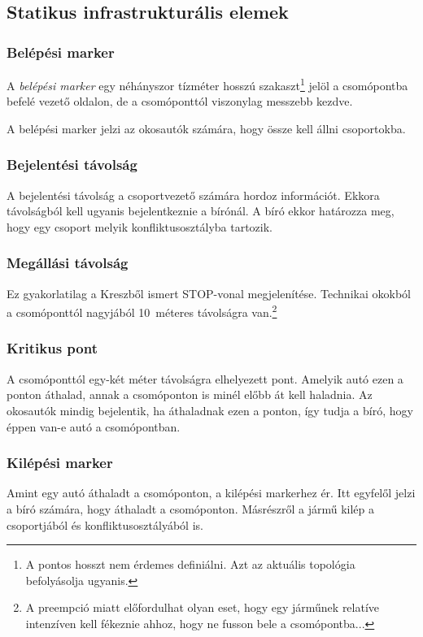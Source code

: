 \documentclass{report}
\begin{document}
			\subsection{Statikus infrastrukturális elemek}
				\subsubsection{Belépési marker}
					A \emph{belépési marker} egy néhányszor tízméter hosszú szakaszt\footnote{A pontos hosszt nem érdemes definiálni. Azt az aktuális topológia befolyásolja ugyanis.} jelöl a csomópontba befelé vezető oldalon, de a csomóponttól viszonylag messzebb kezdve.
					
					A belépési marker jelzi az okosautók számára, hogy össze kell állni csoportokba.
					
				\subsubsection{Bejelentési távolság}
					A bejelentési távolság a csoportvezető számára hordoz információt. Ekkora távolságból kell ugyanis bejelentkeznie a bírónál. A bíró ekkor határozza meg, hogy egy csoport melyik konfliktusosztályba tartozik.
					
				\subsubsection{Megállási távolság}
					Ez gyakorlatilag a Kreszből ismert STOP-vonal megjelenítése. Technikai okokból a csomóponttól nagyjából 10~méteres távolságra van.\footnote{A preempció miatt előfordulhat olyan eset, hogy egy járműnek relatíve intenzíven kell fékeznie ahhoz, hogy ne fusson bele a csomópontba...}
				
				\subsubsection{Kritikus pont}
					A csomóponttól egy-két méter távolságra elhelyezett pont. Amelyik autó ezen a ponton áthalad, annak a csomóponton is minél előbb át kell haladnia. Az okosautók mindig bejelentik, ha áthaladnak ezen a ponton, így tudja a bíró, hogy éppen van-e autó a csomópontban.
					
				\subsubsection{Kilépési marker}
					Amint egy autó áthaladt a csomóponton, a kilépési markerhez ér. Itt egyfelől jelzi a bíró számára, hogy áthaladt a csomóponton. Másrészről a jármű kilép a csoportjából és konfliktusosztályából is.
					
\end{document}

